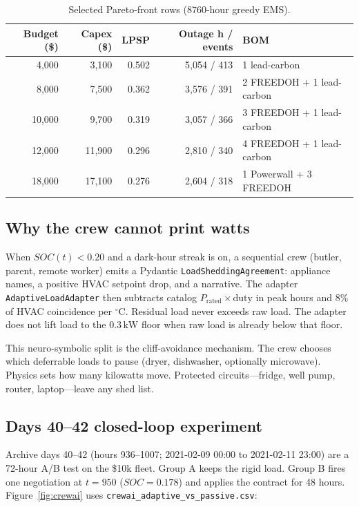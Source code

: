 \documentclass[12pt]{article}
\begin{document}
\begin{table}[htbp]
\centering
\caption{Selected Pareto-front rows (8760-hour greedy EMS).}
\label{tab:pareto}
\small
\begin{tabular}{rrrrl}
\toprule
Budget (\$) & Capex (\$) & LPSP & Outage h / events & BOM \\
\midrule
4{,}000  & 3{,}100  & 0.502 & 5{,}054 / 413 & 1 lead-carbon \\
8{,}000  & 7{,}500  & 0.362 & 3{,}576 / 391 & 2 FREEDOH + 1 lead-carbon \\
10{,}000 & 9{,}700  & 0.319 & 3{,}057 / 366 & 3 FREEDOH + 1 lead-carbon \\
12{,}000 & 11{,}900 & 0.296 & 2{,}810 / 340 & 4 FREEDOH + 1 lead-carbon \\
18{,}000 & 17{,}100 & 0.276 & 2{,}604 / 318 & 1 Powerwall + 3 FREEDOH \\
\bottomrule
\end{tabular}
\end{table}

\subsection{Why the crew cannot print watts}
When \(SOC(t)<0.20\) and a dark-hour streak is on, a sequential crew
(butler, parent, remote worker) emits a Pydantic
\texttt{LoadSheddingAgreement}: appliance names, a positive HVAC
setpoint drop, and a narrative. The adapter
\texttt{AdaptiveLoadAdapter} then subtracts catalog
\(P_{\mathrm{rated}}\times\mathrm{duty}\) in peak hours and \(8\%\) of
HVAC coincidence per \(^\circ\mathrm{C}\). Residual load never exceeds
raw load. The adapter does not lift load to the \(0.3\,\mathrm{kW}\)
floor when raw load is already below that floor.

This neuro-symbolic split is the cliff-avoidance mechanism. The crew
chooses which deferrable loads to pause (dryer, dishwasher, optionally
microwave). Physics sets how many kilowatts move. Protected
circuits---fridge, well pump, router, laptop---leave any shed list.

\subsection{Days 40--42 closed-loop experiment}
Archive days 40--42 (hours 936--1007; 2021-02-09 00:00 to
2021-02-11 23:00) are a 72-hour A/B test on the \$10k fleet. Group A
keeps the rigid load. Group B fires one negotiation at \(t=950\)
(\(SOC=0.178\)) and applies the contract for 48 hours.
Figure~\ref{fig:crewai} uses \texttt{crewai\_adaptive\_vs\_passive.csv}:
\end{document}
